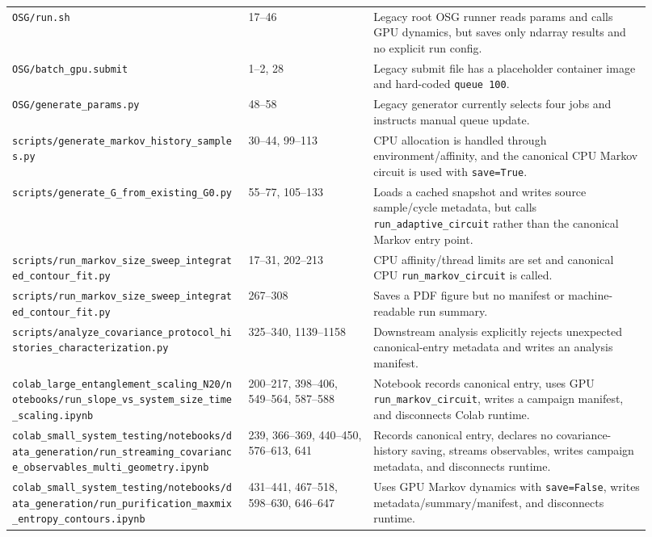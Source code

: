 \documentclass[aps,prb,onecolumn,nofootinbib,superscriptaddress]{revtex4-2}
\begin{document}
\begin{table}[h]
\begin{ruledtabular}
\begin{tabular}{p{0.34\linewidth}p{0.18\linewidth}p{0.40\linewidth}}
\texttt{OSG/run.sh} & 17--46 & Legacy root OSG runner reads params and calls GPU dynamics, but saves only ndarray results and no explicit run config. \\
\texttt{OSG/batch\_gpu.submit} & 1--2, 28 & Legacy submit file has a placeholder container image and hard-coded \texttt{queue 100}. \\
\texttt{OSG/generate\_params.py} & 48--58 & Legacy generator currently selects four jobs and instructs manual queue update. \\
\texttt{scripts/generate\_markov\_history\_samples.py} & 30--44, 99--113 & CPU allocation is handled through environment/affinity, and the canonical CPU Markov circuit is used with \texttt{save=True}. \\
\texttt{scripts/generate\_G\_from\_existing\_G0.py} & 55--77, 105--133 & Loads a cached snapshot and writes source sample/cycle metadata, but calls \texttt{run\_adaptive\_circuit} rather than the canonical Markov entry point. \\
\texttt{scripts/run\_markov\_size\_sweep\_integrated\_contour\_fit.py} & 17--31, 202--213 & CPU affinity/thread limits are set and canonical CPU \texttt{run\_markov\_circuit} is called. \\
\texttt{scripts/run\_markov\_size\_sweep\_integrated\_contour\_fit.py} & 267--308 & Saves a PDF figure but no manifest or machine-readable run summary. \\
\texttt{scripts/analyze\_covariance\_protocol\_histories\_characterization.py} & 325--340, 1139--1158 & Downstream analysis explicitly rejects unexpected canonical-entry metadata and writes an analysis manifest. \\
\texttt{colab\_large\_entanglement\_scaling\_N20/notebooks/run\_slope\_vs\_system\_size\_time\_scaling.ipynb} & 200--217, 398--406, 549--564, 587--588 & Notebook records canonical entry, uses GPU \texttt{run\_markov\_circuit}, writes a campaign manifest, and disconnects Colab runtime. \\
\texttt{colab\_small\_system\_testing/notebooks/data\_generation/run\_streaming\_covariance\_observables\_multi\_geometry.ipynb} & 239, 366--369, 440--450, 576--613, 641 & Records canonical entry, declares no covariance-history saving, streams observables, writes campaign metadata, and disconnects runtime. \\
\texttt{colab\_small\_system\_testing/notebooks/data\_generation/run\_purification\_maxmix\_entropy\_contours.ipynb} & 431--441, 467--518, 598--630, 646--647 & Uses GPU Markov dynamics with \texttt{save=False}, writes metadata/summary/manifest, and disconnects runtime. \\
\end{tabular}
\end{ruledtabular}
\end{table}
\end{document}
